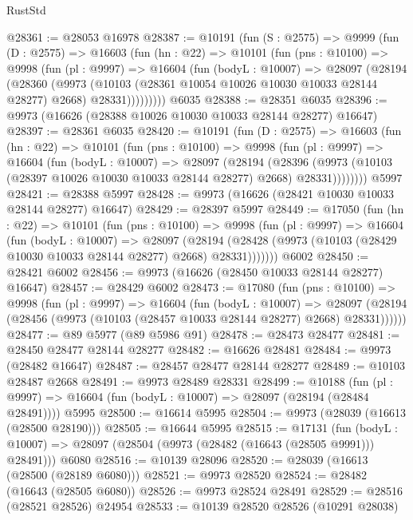 \begin{lexlean}{RustStd}
\begin{coremodule}
@28361 := @28053 @16978
@28387 := @10191
    (fun (S : @2575) =>
    @9999
      (fun (D : @2575) =>
      @16603
        (fun (hn : @22) =>
        @10101
          (fun (pns : @10100) =>
          @9998
            (fun (pl : @9997) =>
            @16604
              (fun (bodyL : @10007) =>
              @28097
                (@28194
                  (@28360
                    (@9973
                      (@10103 (@28361 @10054 @10026 @10030 @10033 @28144 @28277) @2668)
                      @28331)))))))))
    @6035
@28388 := @28351 @6035
@28396 := @9973 (@16626 (@28388 @10026 @10030 @10033 @28144 @28277) @16647)
@28397 := @28361 @6035
@28420 := @10191
    (fun (D : @2575) =>
    @16603
      (fun (hn : @22) =>
      @10101
        (fun (pns : @10100) =>
        @9998
          (fun (pl : @9997) =>
          @16604
            (fun (bodyL : @10007) =>
            @28097
              (@28194
                (@28396
                  (@9973 (@10103 (@28397 @10026 @10030 @10033 @28144 @28277) @2668) @28331))))))))
    @5997
@28421 := @28388 @5997
@28428 := @9973 (@16626 (@28421 @10030 @10033 @28144 @28277) @16647)
@28429 := @28397 @5997
@28449 := @17050
    (fun (hn : @22) =>
    @10101
      (fun (pns : @10100) =>
      @9998
        (fun (pl : @9997) =>
        @16604
          (fun (bodyL : @10007) =>
          @28097
            (@28194 (@28428 (@9973 (@10103 (@28429 @10030 @10033 @28144 @28277) @2668) @28331)))))))
    @6002
@28450 := @28421 @6002
@28456 := @9973 (@16626 (@28450 @10033 @28144 @28277) @16647)
@28457 := @28429 @6002
@28473 := @17080
    (fun (pns : @10100) =>
    @9998
      (fun (pl : @9997) =>
      @16604
        (fun (bodyL : @10007) =>
        @28097 (@28194 (@28456 (@9973 (@10103 (@28457 @10033 @28144 @28277) @2668) @28331))))))
@28477 := @89 @5977 (@89 @5986 @91)
@28478 := @28473 @28477
@28481 := @28450 @28477 @28144 @28277
@28482 := @16626 @28481
@28484 := @9973 (@28482 @16647)
@28487 := @28457 @28477 @28144 @28277
@28489 := @10103 @28487 @2668
@28491 := @9973 @28489 @28331
@28499 := @10188
    (fun (pl : @9997) => @16604 (fun (bodyL : @10007) => @28097 (@28194 (@28484 @28491))))
    @5995
@28500 := @16614 @5995
@28504 := @9973 (@28039 (@16613 (@28500 @28190)))
@28505 := @16644 @5995
@28515 := @17131
    (fun (bodyL : @10007) => @28097 (@28504 (@9973 (@28482 (@16643 (@28505 @9991))) @28491)))
    @6080
@28516 := @10139 @28096
@28520 := @28039 (@16613 (@28500 (@28189 @6080)))
@28521 := @9973 @28520
@28524 := @28482 (@16643 (@28505 @6080))
@28526 := @9973 @28524 @28491
@28529 := @28516 (@28521 @28526) @24954
@28533 := @10139 @28520 @28526 (@10291 @28038)

\end{coremodule}
\end{lexlean}
